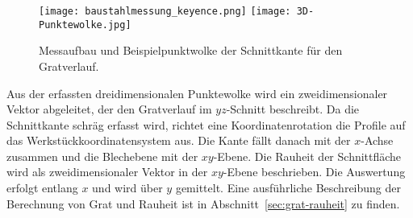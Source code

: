 \begin{figure}[h!]
    \centering
    \texttt{[image: baustahlmessung\_keyence.png]}\hfill
    \texttt{[image: 3D-Punktewolke.jpg]}
    \caption{Messaufbau und Beispielpunktwolke der Schnittkante für den Gratverlauf.}
    \label{fig:schnittkante-setup}
\end{figure}

Aus der erfassten dreidimensionalen Punktewolke wird ein zweidimensionaler Vektor abgeleitet, der den Gratverlauf im \(yz\)-Schnitt beschreibt. Da die Schnittkante schräg erfasst wird, richtet eine Koordinatenrotation die Profile auf das Werkstückkoordinatensystem aus. Die Kante fällt danach mit der \(x\)-Achse zusammen und die Blechebene mit der \(xy\)-Ebene. Die Rauheit der Schnittfläche wird als zweidimensionaler Vektor in der \(xy\)-Ebene beschrieben. Die Auswertung erfolgt entlang \(x\) und wird über \(y\) gemittelt. Eine ausführliche Beschreibung der Berechnung von Grat und Rauheit ist in Abschnitt~\ref{sec:grat-rauheit} zu finden.
